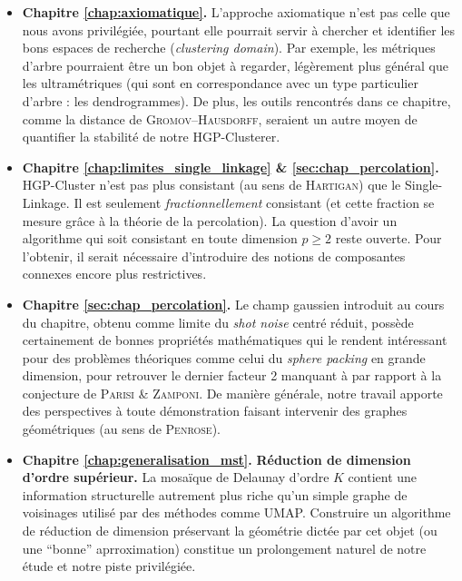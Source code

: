 \begin{itemize}
    \item \textbf{Chapitre \ref{chap:axiomatique}.} L'approche axiomatique n'est pas celle que nous avons privilégiée, pourtant elle pourrait servir à chercher et identifier les bons espaces de recherche (\emph{clustering domain}). Par exemple, les métriques d'arbre pourraient être un bon objet à regarder, légèrement plus général que les ultramétriques (qui sont en correspondance avec un type particulier d'arbre : les dendrogrammes). De plus, les outils rencontrés dans ce chapitre, comme la distance de \textsc{Gromov--Hausdorff}, seraient un autre moyen de quantifier la stabilité de notre HGP-Clusterer.
    \item \textbf{Chapitre \ref{chap:limites_single_linkage} \& \ref{sec:chap_percolation}.} HGP-Cluster n'est pas plus consistant (au sens de \textsc{Hartigan}) que le Single-Linkage. Il est seulement \emph{fractionnellement} consistant (et cette fraction se mesure grâce à la théorie de la percolation). La question d'avoir un algorithme qui soit consistant en toute dimension $p \ge 2$ reste ouverte. Pour l'obtenir, il serait nécessaire d'introduire des notions de composantes connexes encore plus restrictives.
    \item \textbf{Chapitre \ref{sec:chap_percolation}.} Le champ gaussien introduit au cours du chapitre, obtenu comme limite du \emph{shot noise} centré réduit, possède certainement de bonnes propriétés mathématiques qui le rendent intéressant pour des problèmes théoriques comme celui du \emph{sphere packing} en grande dimension, pour retrouver le dernier facteur 2 manquant à \cite{Campos2023SpherePacking} par rapport à la conjecture de \textsc{Parisi} \& \textsc{Zamponi}. De manière générale, notre travail apporte des perspectives à toute démonstration faisant intervenir des graphes géométriques (au sens de \textsc{Penrose}).  
    \item \textbf{Chapitre \ref{chap:generalisation_mst}.} \textbf{Réduction de dimension d'ordre supérieur.} La mosaïque de Delaunay d'ordre $K$ contient une information structurelle autrement plus riche qu'un simple graphe de voisinages utilisé par des méthodes comme UMAP. Construire un algorithme de réduction de dimension préservant la géométrie dictée par cet objet (ou une ``bonne'' aprroximation) constitue un prolongement naturel de notre étude et notre piste privilégiée.

\end{itemize}
